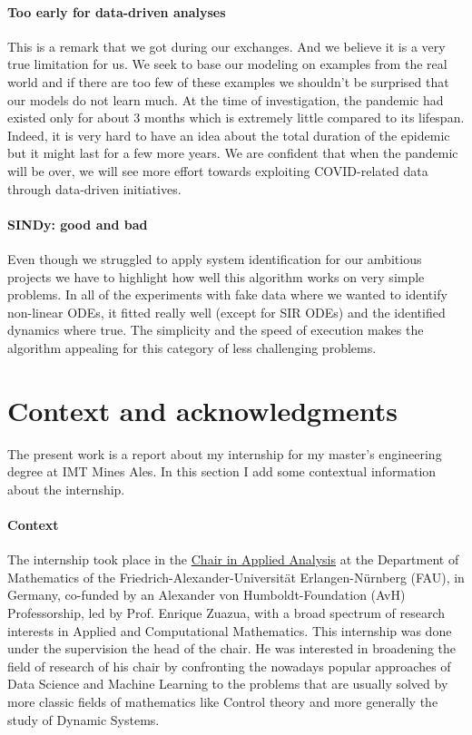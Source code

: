 \documentclass[12pt, letterpaper]{article}
\begin{document}
\paragraph{Too early for data-driven analyses} This is a remark that we got during our exchanges.
And we believe it is a very true limitation for us.
We seek to base our modeling on examples from the real world and if there are too few of these examples we shouldn't be surprised that our models do not learn much.
At the time of investigation, the pandemic had existed only for about 3 months which is extremely little compared to its lifespan.
Indeed, it is very hard to have an idea about the total duration of the epidemic but it might last for a few more years.
We are confident that when the pandemic will be over, we will see more effort towards exploiting COVID-related data through data-driven initiatives.

\paragraph{SINDy: good and bad} Even though we struggled to apply system identification for our ambitious projects we have to highlight how well this algorithm works on very simple problems.
In all of the experiments with fake data where we wanted to identify non-linear ODEs, it fitted really well (except for SIR ODEs) and the identified dynamics where true.
The simplicity and the speed of execution makes the algorithm appealing for this category of less challenging problems.



\section*{Context and acknowledgments}
\label{sec:acknowledgments}

The present work is a report about my internship for my master's engineering degree at IMT Mines Ales. In this section I add some contextual information about the internship.

\paragraph{Context} The internship took place in the \href{https://en.www.math.fau.de/applied-analysis/}{Chair 
in Applied Analysis} at the Department of Mathematics of the Friedrich-Alexander-Universität Erlangen-Nürnberg (FAU), in Germany, co-funded by an Alexander von Humboldt-Foundation (AvH) Professorship, led by Prof. Enrique Zuazua, with a broad spectrum of research interests in Applied and Computational Mathematics. 
This internship was done under the supervision the head of the chair. 
He was interested in broadening the field of research of his chair by confronting the nowadays popular approaches of Data Science and Machine Learning to the problems that are usually solved by more classic fields of mathematics like Control theory and more generally the study of Dynamic Systems. 
\end{document}
